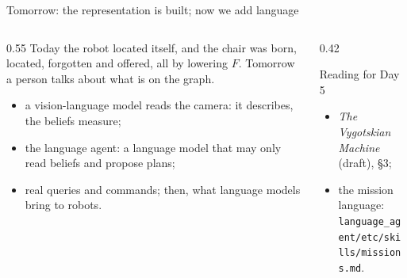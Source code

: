 \documentclass[10pt, aspectratio=169]{beamer}
\begin{document}
\begin{frame}{Tomorrow: the representation is built; now we add language}
  \begin{columns}[c]
    \begin{column}{0.55\textwidth}
      Today the robot located itself, and the chair was born, located, forgotten and offered, all by lowering $F$.
      Tomorrow a person talks about what is on the graph.
      \begin{itemize}
        \item a vision-language model reads the camera: it describes, the beliefs measure;
        \item the language agent: a language model that may only read beliefs and propose plans;
        \item real queries and commands; then, what language models bring to robots.
      \end{itemize}
    \end{column}
    \begin{column}{0.42\textwidth}
      \begin{block}{Reading for Day 5}\small
        \begin{itemize}
          \item \emph{The Vygotskian Machine} (draft), \S3;
          \item the mission language:\\ \texttt{\scriptsize language\_agent/etc/skills/missions.md}.
        \end{itemize}
      \end{block}
    \end{column}
  \end{columns}
\end{frame}

\appendix
\end{document}
